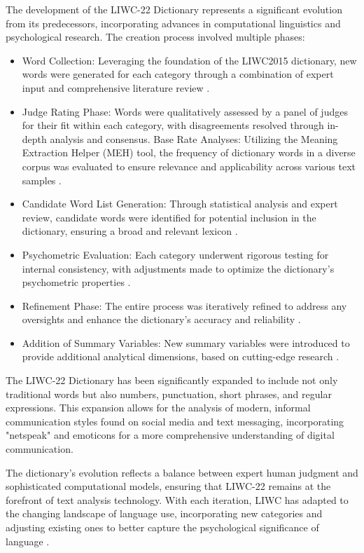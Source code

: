 The development of the LIWC-22 Dictionary represents a significant evolution from its predecessors, incorporating advances in computational linguistics and psychological research. The creation process involved multiple phases:
\begin{itemize}
\item Word Collection: Leveraging the foundation of the LIWC2015 dictionary, new words were generated for each category through a combination of expert input and comprehensive literature review \cite{boyd2022development}.
\item Judge Rating Phase: Words were qualitatively assessed by a panel of judges for their fit within each category, with disagreements resolved through in-depth analysis and consensus.
Base Rate Analyses: Utilizing the Meaning Extraction Helper (MEH) tool, the frequency of dictionary words in a diverse corpus was evaluated to ensure relevance and applicability across various text samples \cite{boyd2022development}.
\item Candidate Word List Generation: Through statistical analysis and expert review, candidate words were identified for potential inclusion in the dictionary, ensuring a broad and relevant lexicon \cite{boyd2022development}.
\item Psychometric Evaluation: Each category underwent rigorous testing for internal consistency, with adjustments made to optimize the dictionary's psychometric properties \cite{boyd2022development}.
\item Refinement Phase: The entire process was iteratively refined to address any oversights and enhance the dictionary's accuracy and reliability \cite{boyd2022development}.
\item Addition of Summary Variables: New summary variables were introduced to provide additional analytical dimensions, based on cutting-edge research \cite{boyd2022development}.
\end{itemize}

The LIWC-22 Dictionary has been significantly expanded to include not only traditional words but also numbers, punctuation, short phrases, and regular expressions. This expansion allows for the analysis of modern, informal communication styles found on social media and text messaging, incorporating "netspeak" and emoticons for a more comprehensive understanding of digital communication.

The dictionary's evolution reflects a balance between expert human judgment and sophisticated computational models, ensuring that LIWC-22 remains at the forefront of text analysis technology. With each iteration, LIWC has adapted to the changing landscape of language use, incorporating new categories and adjusting existing ones to better capture the psychological significance of language \cite{boyd2022development}.

